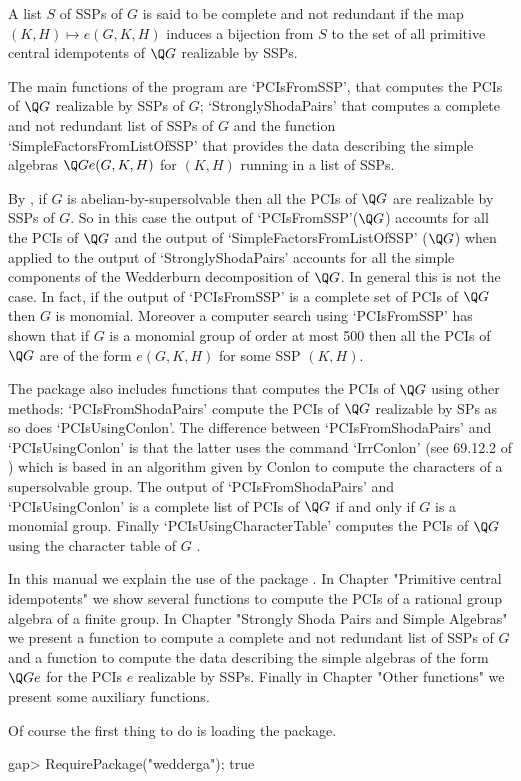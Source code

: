 A list $S$ of SSPs of $G$ is said to be complete and not redundant if the map $(K,H)\mapsto 
e(G,K,H)$ induces a bijection from $S$ to the set of all primitive central idempotents of 
$\Q G$ realizable by SSPs. 
    
The main functions of the program are `PCIsFromSSP', that computes the PCIs of $\Q G$ 
realizable by SSPs of $G$; `StronglyShodaPairs' that computes a complete and not redundant list 
of SSPs of $G$ and the function `SimpleFactorsFromListOfSSP' that provides the data describing 
the simple algebras $\Q Ge(G,K,H)$ for $(K,H)$ running in a list of SSPs. 

By \cite{ORS}, if $G$ is abelian-by-supersolvable then all the PCIs of $\Q G$ are realizable 
by SSPs of $G$. So in this case the output of `PCIsFromSSP'($\Q G$) accounts for all the PCIs of $\Q 
G$ and the output of `SimpleFactorsFromListOfSSP' ($\Q G$) when applied to the output of 
`StronglyShodaPairs' accounts for all the simple components of the Wedderburn decomposition of 
$\Q G$. In general this is not the case. In fact, if the output of `PCIsFromSSP' is a complete 
set of PCIs of $\Q G$ then $G$ is monomial. Moreover a computer search using `PCIsFromSSP' has 
shown that if $G$ is a monomial group of order at most 500 then all the PCIs of $\Q G$ are of 
the form $e(G,K,H)$ for some SSP $(K,H)$. 

The package also includes functions that computes the PCIs of $\Q G$ using other 
methods: `PCIsFromShodaPairs' compute the PCIs of $\Q G$ realizable by SPs as so 
does `PCIsUsingConlon'. The difference between `PCIsFromShodaPairs' and 
`PCIsUsingConlon' is that the latter uses the command `IrrConlon' (see 69.12.2 of 
\cite{GapManual}) which is based in an algorithm given by Conlon \cite{C} to compute 
the characters of a supersolvable group. The output of `PCIsFromShodaPairs' and 
`PCIsUsingConlon' is a complete list of PCIs of $\Q G$ if and only if $G$ is a 
monomial group. Finally `PCIsUsingCharacterTable' computes the PCIs of $\Q G$ using 
the character table of $G$ \cite{Y}. 

In this manual we explain the use of the package {\wedderga}. In Chapter "Primitive central 
idempotents" we show several functions to compute the PCIs of a rational group algebra of a 
finite group. In Chapter "Strongly Shoda Pairs and Simple Algebras" we present a function to 
compute a complete and not redundant list of SSPs of $G$ and a function to compute the data 
describing the simple algebras of the form $\Q Ge$ for the PCIs $e$ realizable by SSPs. 
Finally in Chapter "Other functions" we present some auxiliary functions.
\bigskip 

Of course the first thing to do is loading the package.

\beginexample
    gap> RequirePackage("wedderga");
    true
\endexample
